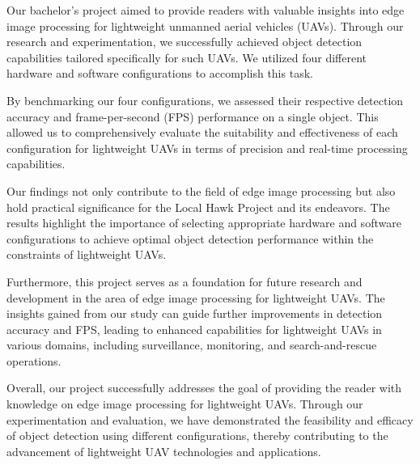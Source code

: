 Our bachelor's project aimed to provide readers with valuable insights into edge image processing for lightweight unmanned aerial vehicles (UAVs). Through our research and experimentation, we successfully achieved object detection capabilities tailored specifically for such UAVs. We utilized four different hardware and software configurations to accomplish this task.

By benchmarking our four configurations, we assessed their respective detection accuracy and frame-per-second (FPS) performance on a single object. This allowed us to comprehensively evaluate the suitability and effectiveness of each configuration for lightweight UAVs in terms of precision and real-time processing capabilities.

Our findings not only contribute to the field of edge image processing but also hold practical significance for the Local Hawk Project and its endeavors. The results highlight the importance of selecting appropriate hardware and software configurations to achieve optimal object detection performance within the constraints of lightweight UAVs.

Furthermore, this project serves as a foundation for future research and development in the area of edge image processing for lightweight UAVs. The insights gained from our study can guide further improvements in detection accuracy and FPS, leading to enhanced capabilities for lightweight UAVs in various domains, including surveillance, monitoring, and search-and-rescue operations.

Overall, our project successfully addresses the goal of providing the reader with knowledge on edge image processing for lightweight UAVs. Through our experimentation and evaluation, we have demonstrated the feasibility and efficacy of object detection using different configurations, thereby contributing to the advancement of lightweight UAV technologies and applications.